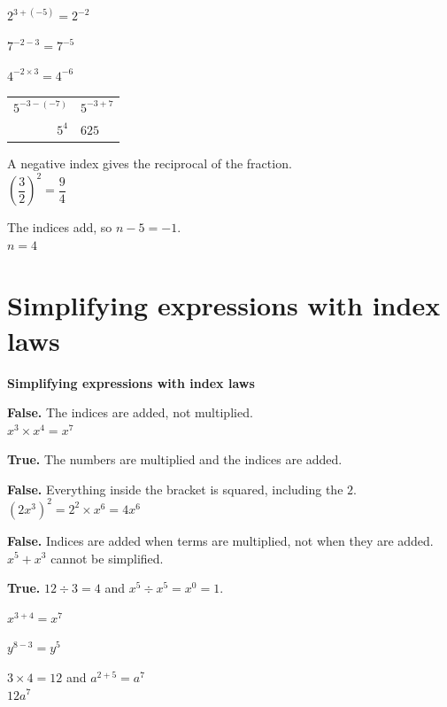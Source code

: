 \documentclass[aspectratio=169]{beamer}
\makeatletter
\newcommand{\qtopic}[1]{%
  \section{#1}%
  \begin{frame}
    \vfill
    \begin{center}
      {\usebeamercolor[fg]{structure}\Huge\bfseries #1}
    \end{center}
    \vfill
  \end{frame}%
}
\newcommand{\work}[1]{%
  \begin{tabular}{@{}r@{\;=\;}l@{}}#1\end{tabular}%
}
\makeatother
\begin{document}
  {$2^{3+(-5)}=2^{-2}$}

  {$7^{-2-3}=7^{-5}$}

  {$4^{-2\times 3}=4^{-6}$}

  {\work{$5^{-3-(-7)}$ & $5^{-3+7}$\\[0.3em]
         $5^{4}$ & $625$}}

  {A negative index gives the reciprocal of the fraction.\\[0.4em]
   $\left(\dfrac{3}{2}\right)^{2}=\dfrac{9}{4}$}

  {The indices add, so $n-5=-1$.\\[0.3em]
   $n=4$}

\qtopic{Simplifying expressions with index laws}

  {\textbf{False.} The indices are added, not multiplied.\\[0.3em]
   $x^{3}\times x^{4}=x^{7}$}

  {\textbf{True.} The numbers are multiplied and the indices are added.}

  {\textbf{False.} Everything inside the bracket is squared, including
   the $2$.\\[0.3em]
   $\left(2x^{3}\right)^{2}=2^{2}\times x^{6}=4x^{6}$}

  {\textbf{False.} Indices are added when terms are multiplied, not
   when they are added.\\[0.3em]
   $x^{5}+x^{3}$ cannot be simplified.}

  {\textbf{True.} $12\div 3=4$ and $x^{5}\div x^{5}=x^{0}=1$.}

  {$x^{3+4}=x^{7}$}

  {$y^{8-3}=y^{5}$}

  {$3\times 4=12$ and $a^{2+5}=a^{7}$\\[0.3em]
   $12a^{7}$}
\end{document}
